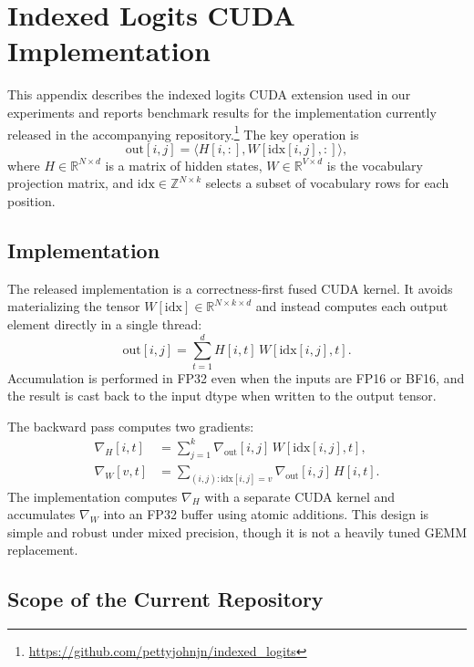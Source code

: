 \section{Indexed Logits CUDA Implementation}
\label{app:IndexedLogits}

This appendix describes the indexed logits CUDA extension used in our experiments and reports benchmark results for the implementation currently released in the accompanying repository.\footnote{\url{https://github.com/pettyjohnjn/indexed_logits}} The key operation is
\begin{equation}
\mathrm{out}[i,j] = \langle H[i,:], W[\mathrm{idx}[i,j],:] \rangle,
\end{equation}
where $H \in \mathbb{R}^{N \times d}$ is a matrix of hidden states, $W \in \mathbb{R}^{V \times d}$ is the vocabulary projection matrix, and $\mathrm{idx} \in \mathbb{Z}^{N \times k}$ selects a subset of vocabulary rows for each position.

\subsection{Implementation}

The released implementation is a correctness-first fused CUDA kernel. It avoids materializing the tensor $W[\mathrm{idx}] \in \mathbb{R}^{N \times k \times d}$ and instead computes each output element directly in a single thread:
\begin{equation}
\mathrm{out}[i,j] = \sum_{t=1}^{d} H[i,t] \, W[\mathrm{idx}[i,j], t].
\end{equation}
Accumulation is performed in FP32 even when the inputs are FP16 or BF16, and the result is cast back to the input dtype when written to the output tensor.

The backward pass computes two gradients:
\begin{align}
\nabla_H[i,t] &= \sum_{j=1}^{k} \nabla_{\mathrm{out}}[i,j] \, W[\mathrm{idx}[i,j], t], \\
\nabla_W[v,t] &= \sum_{(i,j): \mathrm{idx}[i,j]=v} \nabla_{\mathrm{out}}[i,j] \, H[i,t].
\end{align}
The implementation computes $\nabla_H$ with a separate CUDA kernel and accumulates $\nabla_W$ into an FP32 buffer using atomic additions. This design is simple and robust under mixed precision, though it is not a heavily tuned GEMM replacement.

\subsection{Scope of the Current Repository}

